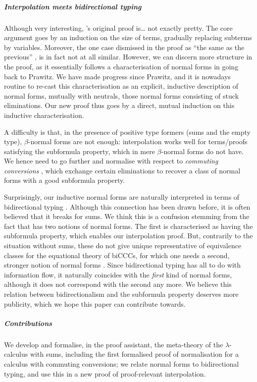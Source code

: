 \documentclass[a4paper,UKenglish,cleveref, autoref, thm-restate]{lipics-v2021}
\begin{document}
\subparagraph*{Interpolation meets bidirectional typing}
Although very interesting, \Cubric's original proof is… not exactly pretty.
The core argument goes by an induction on the size of terms, gradually replacing
subterms by variables. Moreover, the one case dismissed in the proof as
``the same as the previous'' \cite[Subcase 6.3.2]{Cubric1994}, is in fact not
at all similar.
%
However, we can discern more structure in the proof, as it essentially follows
a characterisation of normal forms in \stlcp going back to
Prawitz. We have made progress since Prawitz,
and it is nowadays routine \cite{Abel2013,Fiore2022}
to re-cast this characterisation as an explicit,
inductive description of normal forms, mutually with neutrals,
those normal forms consisting of stuck eliminations.
Our new proof thus goes by a direct, mutual induction
on this inductive characterisation. 

A difficulty is that, in the presence of positive type formers
(sums and the empty type), \(\beta\)-normal forms are not enough: interpolation
works well for terms/proofs satisfying the subformula property, which in
\stlcp mere \(\beta\)-normal forms do not have. We hence need to go further and
normalise with respect to \emph{commuting conversions} \cite{Girard1989}, which
exchange certain eliminations to recover a class of normal forms with a
good subformula property.

Surprisingly, our inductive normal forms are
naturally interpreted in terms of bidirectional typing \cite{Pierce2000,Dunfield2021}.
Although this connection has been drawn before, it is
often believed that it breaks for sums. We think this is
a confusion stemming from the fact that \stlcp has two notions of normal forms.
The first is characterised as having the subformula property, which
enables our interpolation proof. But, contrarily to the situation without sums,
these do not give unique representative of equivalence
classes for the equational theory of biCCCs, for which one needs
a second, stronger notion of normal forms \cite{Scherer2017}. Since bidirectional typing
has all to do with information flow, it naturally coincides with the
\emph{first} kind of normal forms, although it does not correspond with the second
any more. We believe this relation between bidirectionalism and
the subformula property deserves more publicity, which we hope this paper can
contribute towards.

\subparagraph*{Contributions}
We develop and formalise, in the \Rocq proof assistant,
the meta-theory of the \(\lambda\)-calculus with sums,
including the first formalised proof of normalisation
for a calculus with commuting conversions; we relate normal
forms to bidirectional typing, and
use this in a new proof of proof-relevant interpolation.
\end{document}

